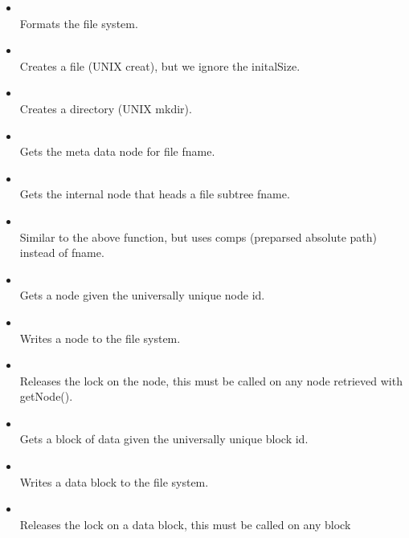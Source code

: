   \begin{itemize}
      \item		{}\\
	Formats the file system. 

      \item		{}\\
	Creates a file (UNIX creat), but we ignore the initalSize.
      \item		{} \\
	Creates a directory (UNIX mkdir).

      \item		{}\\
	Gets the meta data node for file fname.
      \item		{}\\
	Gets the internal node that heads a file subtree fname.
      \item		{}\\
	Similar to the above function, but uses comps (preparsed absolute path)
	instead of fname.
      \item		{}\\
	Gets a node given the universally unique node id.
      \item		{}\\
	Writes a node to the file system.
      \item		{}\\
	Releases the lock on the node, this must be called on any node 
	retrieved with getNode().
      \item		{}\\
	Gets a block of data given the universally unique block id.
      \item		{}\\
	Writes a data block to the file system.
      \item		{}\\
	Releases the lock on a data block, this must be called on any block

\end{itemize}
